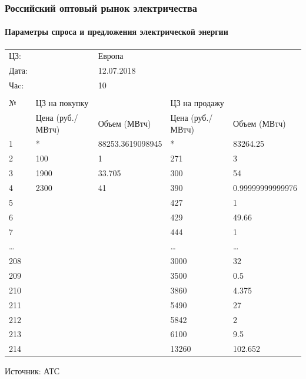 \documentclass[c, dvipsnames]{beamer}  %
\begin{document}
\begin{frame}[shrink=5]
\frametitle{Российский оптовый рынок электричества} 
\framesubtitle{Параметры спроса и предложения электрической энергии} 



\begin{table}[]
	\begin{tabular}{lllll}
		
		ЦЗ: &  & Европа &  &  \\
		Дата: &  & 12.07.2018 &  &  \\
		Чаc: &  & 10 &  &  \\
		&  &  &  &  \\
		№ & ЦЗ на покупку &  & ЦЗ на продажу &  \\
		& Цена (руб./МВтч) & Объем (МВтч) & Цена (руб./МВтч) & Объем (МВтч) \\
		1 & * & 88253.3619098945 & * & 83264.25 \\
		2 & 100 & 1 & 271 & 3 \\
		3 & 1900 & 33.705 & 300 & 54 \\
		4 & 2300 & 41 & 390 & 0.99999999999976 \\
		5 &  &  & 427 & 1 \\
		6 &  &  & 429 & 49.66 \\
		7 &  &  & 444 & 1 \\
		… &  &  & … & … \\
		208 &  &  & 3000 & 32 \\
		209 &  &  & 3500 & 0.5 \\
		210 &  &  & 3860 & 4.375 \\
		211 &  &  & 5490 & 27 \\
		212 &  &  & 5842 & 2 \\
		213 &  &  & 6100 & 9.5 \\
		214 &  &  & 13260 & 102.652
	\end{tabular}
\end{table}

Источник: АТС

\end{frame}
\end{document}
